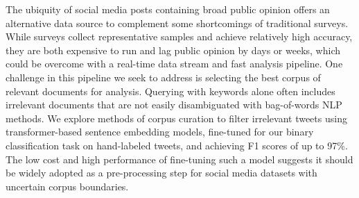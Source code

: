 The ubiquity of social media posts containing broad public opinion
offers an alternative data source to complement some shortcomings of traditional surveys.
While surveys collect representative samples and achieve relatively high accuracy,
they are both expensive to run and lag public opinion by days or weeks,
which could be overcome with a real-time data stream and fast analysis pipeline.
One challenge in this pipeline we seek to address is selecting the best corpus of relevant documents for analysis. 
Querying with keywords alone often includes irrelevant documents that are not easily disambiguated with bag-of-words NLP methods. 
We explore methods of corpus curation to filter irrelevant tweets using transformer-based sentence embedding models,
fine-tuned for our binary classification task on hand-labeled tweets,
and achieving F1 scores of up to 97\%.
The low cost and high performance of fine-tuning such a model suggests it should be widely adopted as a pre-processing step for social media datasets with uncertain corpus boundaries.
